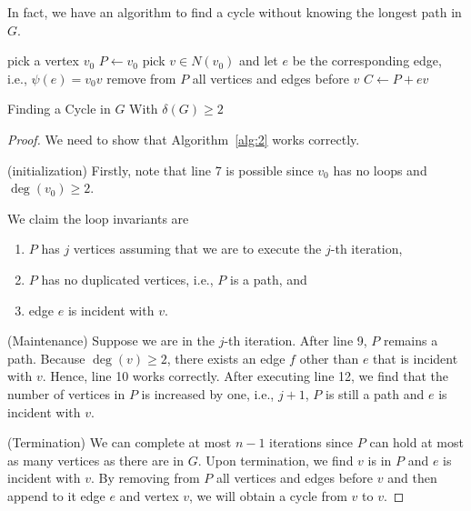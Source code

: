 \documentclass[thmcnt=section, 12pt, color=cyan]{my-elegantbook}
\begin{document}
In fact, we have an algorithm to find a cycle without knowing the longest path in $G$.

\begin{algorithm}[ht]
    pick a vertex $v_0$ \; 
    $P \gets v_0$ \;
    pick $v \in N(v_0)$ and let $e$ be the corresponding edge, i.e., $\psi(e) = v_0 v$ \;
    remove from $P$ all vertices and edges before $v$ \;
    $C \gets P + ev$ \;
    \caption{Finding a Cycle in $G$ With $\delta(G) \geq 2$}
    \label{alg:2}
\end{algorithm}

\begin{proof}
    We need to show that Algorithm~\ref{alg:2} works correctly. 
    
    (initialization) Firstly, note that line 7 is possible since $v_0$ has no loops and $\deg(v_0) \geq 2$. 

    We claim the loop invariants are
    \begin{enumerate}
        \item $P$ has $j$ vertices assuming that we are to execute the $j$-th iteration,
        \item $P$ has no duplicated vertices, i.e., $P$ is a path, and
        \item edge $e$ is incident with $v$.
    \end{enumerate}

    (Maintenance) Suppose we are in the $j$-th iteration. After line 9, $P$ remains a path. Because $\deg(v) \geq 2$, there exists an edge $f$ other than $e$ that is incident with $v$. Hence, line 10 works correctly.  After executing line 12, we find that the number of vertices in $P$ is increased by one, i.e., $j+1$, $P$ is still a path and $e$ is incident with $v$.

    (Termination) We can complete at most $n-1$ iterations since $P$ can hold at most as many vertices as there are in $G$. Upon termination, we find $v$ is in $P$ and $e$ is incident with $v$. By removing from $P$ all vertices and edges before $v$ and then append to it edge $e$ and vertex $v$, we will obtain a cycle from $v$ to $v$. 
\end{proof}
\end{document}
